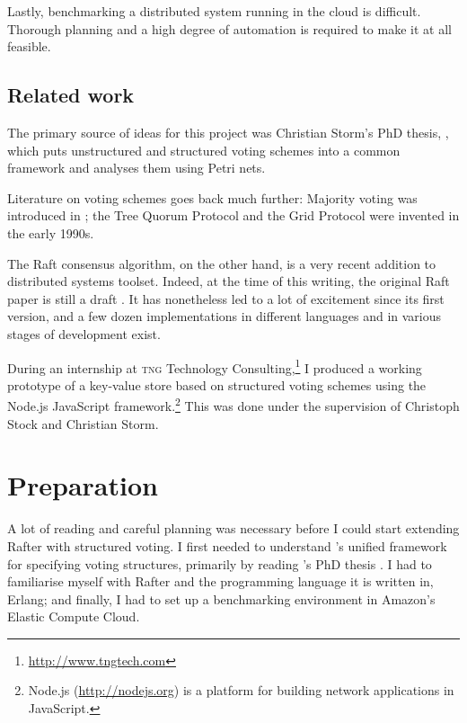 \documentclass[12pt,chapterprefix=true,toc=bibliography,numbers=noendperiod,
               footnotes=multiple,twoside]{scrreprt}
\begin{document}
Lastly, benchmarking a distributed system running in the cloud is difficult. Thorough planning and a high degree of automation is required to make it at all feasible.

\section{Related work}
\label{sc:related-work}

The primary source of ideas for this project was Christian Storm's PhD thesis,  \parencite{voting}, which puts unstructured and structured voting schemes into a common framework and analyses them using Petri nets.

Literature on voting schemes goes back much further: Majority voting \autocite{majority} was introduced in ; the Tree Quorum Protocol \autocites{tree}{gen-tree} and the Grid Protocol \autocites{grid}{bettergrid} were invented in the early 1990s.

The Raft consensus algorithm, on the other hand, is a very recent addition to distributed systems toolset. Indeed, at the time of this writing, the original Raft paper is still a draft \autocite{raft}. It has nonetheless led to a lot of excitement since its first version, and a few dozen implementations in different languages and in various stages of development exist.


During an internship at \textsc{tng} Technology Consulting,\footnote{\url{http://www.tngtech.com}} I produced a working prototype of a key-value store based on structured voting schemes using the Node.js JavaScript framework.\footnote{Node.js (\url{http://nodejs.org}) is a platform for building network applications in JavaScript.} This was done under the supervision of Christoph Stock and Christian Storm.



\chapter{Preparation}
\label{ch:preparation}

A lot of reading and careful planning was necessary before I could start extending Rafter with structured voting. I first needed to understand \citeauthor{generators}'s unified framework for specifying voting structures, primarily by reading \citeauthor{voting}'s PhD thesis \autocite{voting}. I had to familiarise myself with Rafter and the programming language it is written in, Erlang; and finally, I had to set up a benchmarking environment in Amazon's Elastic Compute Cloud.
\end{document}
